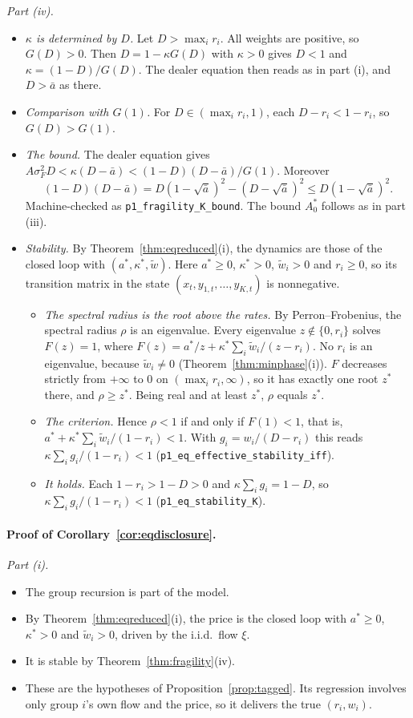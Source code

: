 \documentclass[12pt]{article}
\theoremstyle{definition}
\theoremstyle{remark}
\begin{document}
\emph{Part (iv).}
\begin{itemize}[itemsep=1pt,topsep=2pt]
\item \emph{$\kappa$ is determined by $D$.} Let $D>\max_ir_i$. All weights are positive, so $G(D)>0$. Then $D=1-\kappa G(D)$ with $\kappa>0$ gives $D<1$ and $\kappa=(1-D)/G(D)$. The dealer equation then reads as in part (i), and $D>\bar a$ as there.
\item \emph{Comparison with $G(1)$.} For $D\in(\max_ir_i,1)$, each $D-r_i<1-r_i$, so $G(D)>G(1)$.
\item \emph{The bound.} The dealer equation gives $A\sigma_F^2D<\kappa(D-\bar a)<(1-D)(D-\bar a)/G(1)$. Moreover
\[
 (1-D)(D-\bar a)=D(1-\sqrt{\bar a})^2-(D-\sqrt{\bar a})^2\le D(1-\sqrt{\bar a})^2.
\]
Machine-checked as \nolinkurl{p1_fragility_K_bound}. The bound $A^*_0$ follows as in part (iii).
\item \emph{Stability.} By Theorem~\ref{thm:eqreduced}(i), the dynamics are those of the closed loop with $(a^*,\kappa^*,\tilde w)$. Here $a^*\ge0$, $\kappa^*>0$, $\tilde w_i>0$ and $r_i\ge0$, so its transition matrix in the state $(x_t,y_{1,t},\ldots,y_{K,t})$ is nonnegative.
 \begin{itemize}[itemsep=1pt,topsep=2pt]
 \item \emph{The spectral radius is the root above the rates.} By Perron--Frobenius, the spectral radius $\rho$ is an eigenvalue. Every eigenvalue $z\notin\{0,r_i\}$ solves $F(z)=1$, where $F(z)=a^*/z+\kappa^*\sum_i\tilde w_i/(z-r_i)$. No $r_i$ is an eigenvalue, because $\tilde w_i\ne0$ (Theorem~\ref{thm:minphase}(i)). $F$ decreases strictly from $+\infty$ to $0$ on $(\max_ir_i,\infty)$, so it has exactly one root $z^*$ there, and $\rho\ge z^*$. Being real and at least $z^*$, $\rho$ equals $z^*$.
 \item \emph{The criterion.} Hence $\rho<1$ if and only if $F(1)<1$, that is, $a^*+\kappa^*\sum_i\tilde w_i/(1-r_i)<1$. With $g_i=w_i/(D-r_i)$ this reads $\kappa\sum_ig_i/(1-r_i)<1$ (\nolinkurl{p1_eq_effective_stability_iff}).
 \item \emph{It holds.} Each $1-r_i>1-D>0$ and $\kappa\sum_ig_i=1-D$, so $\kappa\sum_ig_i/(1-r_i)<1$ (\nolinkurl{p1_eq_stability_K}).
 \end{itemize}
\end{itemize}

\paragraph{Proof of Corollary~\ref{cor:eqdisclosure}.}
\emph{Part (i).}
\begin{itemize}[itemsep=1pt,topsep=2pt]
\item The group recursion is part of the model.
\item By Theorem~\ref{thm:eqreduced}(i), the price is the closed loop with $a^*\ge0$, $\kappa^*>0$ and $\tilde w_i>0$, driven by the i.i.d.\ flow $\xi$.
\item It is stable by Theorem~\ref{thm:fragility}(iv).
\item These are the hypotheses of Proposition~\ref{prop:tagged}. Its regression involves only group $i$'s own flow and the price, so it delivers the true $(r_i,w_i)$.
\end{itemize}
\end{document}
